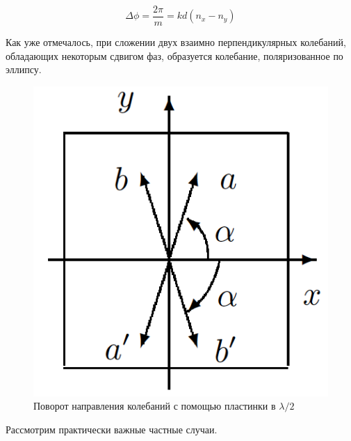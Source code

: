 \documentclass[12pt, a4paper]{article}
\begin{document}
\begin{equation}\label{}
    \Delta \phi =  \dfrac{2\pi}{m} = k d(n_x - n_y)
\end{equation}

Как уже отмечалось, при сложении двух взаимно перпендикулярных колебаний,
обладающих некоторым сдвигом фаз, образуется колебание, поляризованное по
эллипсу.

\begin{figure}
    \vspace{0mm}
    \includegraphics[width=\linewidth]{pics/2.png}
    \caption{Поворот направления колебаний с помощью пластинки в $ \lambda / 2 $}
    \label{ris 2}
\end{figure}
Рассмотрим практически важные частные случаи.
\end{document}
